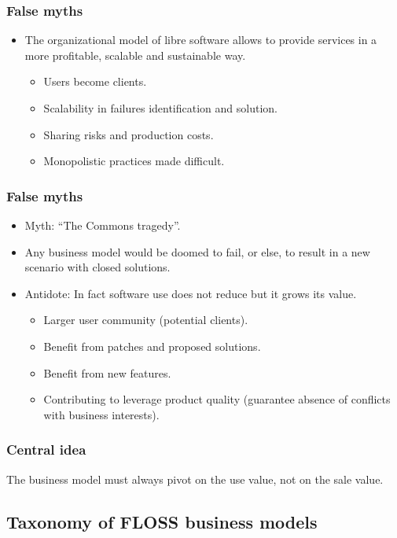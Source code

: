 \begin{frame}
 \frametitle{False myths}
\begin{itemize}
 \item The organizational model of libre software allows to provide services in a more profitable,
scalable and sustainable way.
\begin{itemize}
 \item \alert{Users} become \alert{clients}.
 \item \alert{Scalability} in failures identification and solution.
 \item \alert{Sharing risks} and production \alert{costs}.
 \item Monopolistic practices made \alert{difficult}.
\end{itemize}
\end{itemize}

\end{frame}

\begin{frame}
 \frametitle{False myths}
\begin{itemize}
 \item Myth: ``The Commons tragedy''.
 \item Any business model would be doomed to fail, or else, to result 
in a new scenario with closed solutions.
 \item Antidote: In fact \alert{software use} does not \alert{reduce} but it
\alert{grows its value}.
    \begin{itemize}
    \item Larger user community (potential clients).
    \item Benefit from patches and proposed solutions.
    \item Benefit from new features.
    \item Contributing to leverage product quality (guarantee absence of conflicts 
with business interests).
    \end{itemize}
\end{itemize}
\end{frame}

\begin{frame}
 \frametitle{Central idea}
\Large{The \alert{business model} must always pivot on the \alert{use value}, not on the
sale value.}
\end{frame}

\subsection{Taxonomy of FLOSS business models}

